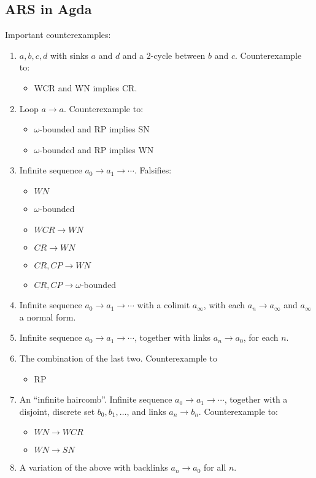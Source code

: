 \documentclass{article}
\begin{document}
\subsection{ARS in Agda}
Important counterexamples:
\begin{enumerate}
  \item $a,b,c,d$ with sinks $a$ and $d$ and a 2-cycle between $b$ and $c$.
  Counterexample to:
  \begin{itemize}
      \item WCR and WN implies CR.
  \end{itemize}
  \item Loop $a \to a$.
  Counterexample to:
  \begin{itemize}
    \item $\omega$-bounded and RP implies SN
    \item $\omega$-bounded and RP implies WN
  \end{itemize}
  \item Infinite sequence $a_0 \to a_1 \to \cdots$. Falsifies:
  \begin{itemize}
    \item $WN$
    \item $\omega$-bounded
    \item $WCR \to WN$
    \item $CR \to WN$
    \item $CR, CP \to WN$
    \item $CR, CP \to \omega$-bounded
  \end{itemize}
  \item Infinite sequence $a_0 \to a_1 \to \cdots$ with a colimit $a_\infty$,
  with each $a_n \to a_\infty$ and $a_\infty$ a normal form.
  \item Infinite sequence $a_0 \to a_1 \to \cdots$, together with links
  $a_n \to a_0$, for each $n$.
  \item The combination of the last two.
  Counterexample to
  \begin{itemize}
    \item RP
  \end{itemize}
  \item An ``infinite haircomb''. Infinite sequence $a_0 \to a_1 \to \cdots$, together with
  a disjoint, discrete set $b_0, b_1, \dots$, and links $a_n \to b_n$.
  Counterexample to:
  \begin{itemize}
    \item $WN\to WCR$
    \item $WN \to SN$
  \end{itemize}
  \item A variation of the above with backlinks $a_n \to a_0$ for all $n$.
\end{enumerate}
\end{document}
